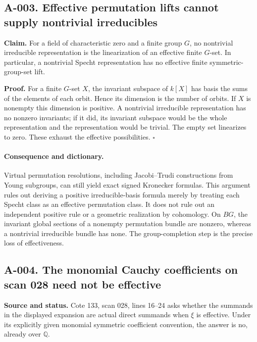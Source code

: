 \subsection*{A-003. Effective permutation lifts cannot supply nontrivial irreducibles}
\textbf{Claim.} For a field of characteristic zero and a finite group $G$,
no nontrivial irreducible representation is the linearization of an effective
finite $G$-set.  In particular, a nontrivial Specht representation has no
effective finite symmetric-group-set lift.

\textbf{Proof.} For a finite $G$-set $X$, the invariant subspace of $k[X]$
has basis the sums of the elements of each orbit.  Hence its dimension is
the number of orbits.  If $X$ is nonempty this dimension is positive.  A
nontrivial irreducible representation has no nonzero invariants; if it did,
its invariant subspace would be the whole representation and the
representation would be trivial.  The empty set linearizes to zero.
These exhaust the effective possibilities. \hfill$\square$

\paragraph{Consequence and dictionary.}
Virtual permutation resolutions, including Jacobi--Trudi constructions from
Young subgroups, can still yield exact signed Kronecker formulas.  This
argument rules out deriving a positive irreducible-basis formula merely by
treating each Specht class as an effective permutation class.  It does not
rule out an independent positive rule or a geometric realization by
cohomology.  On $BG$, the invariant global sections of a nonempty
permutation bundle are nonzero, whereas a nontrivial irreducible bundle has
none.  The group-completion step is the precise loss of effectiveness.

\subsection*{A-004. The monomial Cauchy coefficients on scan 028 need not be effective}
\textbf{Source and status.} Cote 133, scan 028, lines 16--24 asks whether
the summands in the displayed expansion are actual direct summands when
$\xi$ is effective.  Under its explicitly given monomial symmetric
coefficient convention, the answer is no, already over $\mathbb Q$.

